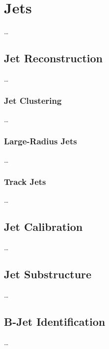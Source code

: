 \graphicspath{{Ch4_Jets/figures/}}

\chapter{Jets}
\dots
\section{Jet Reconstruction}
\dots
\subsection{Jet Clustering}
\dots
\subsection{Large-Radius Jets}
\dots
\subsection{Track Jets}
\dots
\section{Jet Calibration}
\dots
\section{Jet Substructure}
\dots
\section{B-Jet Identification}
\dots